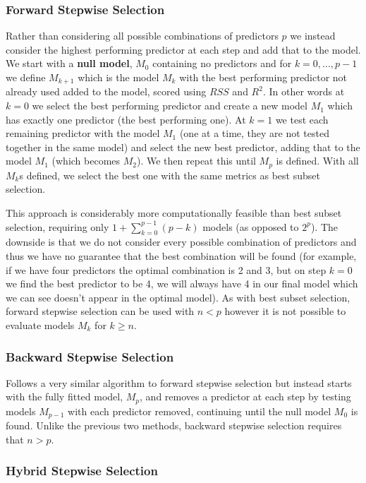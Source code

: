 \subsubsection{Forward Stepwise Selection}

Rather than considering all possible combinations of predictors $p$ we instead consider the highest performing predictor at each step and add that to the model. We start with a \textbf{null model}, $M_{0}$ containing no predictors and for $k=0,...,p-1$ we define $M_{k+1}$ which is the model $M_{k}$ with the best performing predictor not already used added to the model, scored using $RSS$ and $R^{2}$. In other words at $k=0$ we select the best performing predictor and create a new model $M_{1}$ which has exactly one predictor (the best performing one). At $k=1$ we test each remaining predictor with the model $M_{1}$ (one at a time, they are not tested together in the same model) and select the new best predictor, adding that to the model $M_{1}$ (which becomes $M_{2}$). We then repeat this until $M_{p}$ is defined. With all $M_{k}$s defined, we select the best one with the same metrics as best subset selection.

This approach is considerably more computationally feasible than best subset selection, requiring only $1+\sum^{p-1}_{k=0} (p-k)$ models (as opposed to $2^{p}$). The downside is that we do not consider every possible combination of predictors and thus we have no guarantee that the best combination will be found (for example, if we have four predictors the optimal combination is 2 and 3, but on step $k=0$ we find the best predictor to be 4, we will always have 4 in our final model which we can see doesn't appear in the optimal model). As with best subset selection, forward stepwise selection can be used with $n<p$ however it is not possible to evaluate models $M_{k}$ for $k\ge n$.

\subsubsection{Backward Stepwise Selection}

Follows a very similar algorithm to forward stepwise selection but instead starts with the fully fitted model, $M_{p}$, and removes a predictor at each step by testing models $M_{p-1}$ with each predictor removed, continuing until the null model $M_{0}$ is found. Unlike the previous two methods, backward stepwise selection requires that $n>p$.

\subsubsection{Hybrid Stepwise Selection}

